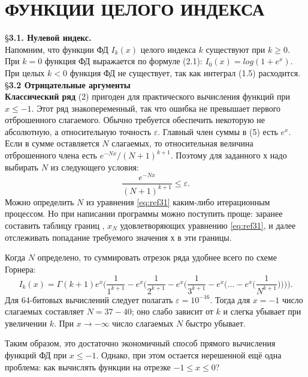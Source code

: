 \chapter{ФУНКЦИИ ЦЕЛОГО ИНДЕКСА}

\S \textbf{3.1. Нулевой индекс.}
\\

Напомним, что функции ФД $I_k(x)$ целого индекса $k$ существуют при $k \geqslant 0$. При $k = 0$ функция ФД выражается по формуле (2.1): $I_0(x)=log(1+e^x).$ При целых $k < 0$ функция ФД не существует, так как интеграл (1.5) расходится.
\\

\S \textbf{3.2 Отрицательные аргументы}
\\

\textbf{Классический ряд} (2) пригоден для практического вычисления функций
при $x \leqslant -1$. Этот ряд знакопеременный, так что ошибка не превышает первого
отброшенного слагаемого. Обычно требуется обеспечить некоторую не
абсолютную, а относительную точность $\varepsilon$. Главный член суммы в (5) есть $e^{x}$.
Если в сумме оставляется $N$ слагаемых, то относительная величина
отброшенного члена есть $e^{-Nx}/(N+1)^{k+1}$. Поэтому для заданного $х$ надо
выбирать $N$ из следующего условия:
\begin{equation}
\frac{e^{-Nx}}{(N+1)^{k+1}} \leqslant \varepsilon.
\label{eq:ref31}
\end{equation}
Можно определить $N$ из уравнения \ref{eq:ref31} каким-либо итерационным
процессом. Но при написании программы можно поступить проще: заранее
составить таблицу границ , $x_{N}$ удовлетворяющих уравнению \ref{eq:ref31}, и далее
отслеживать попадание требуемого значения $х$ в эти границы.

Когда $N$ определено, то суммировать отрезок ряда удобнее всего по схеме Горнера:
\begin{equation}
I_k(x)=\Gamma(k+1)e^{x}\Bigg(\frac{1}{1^{k+1}}-e^{x}\Bigg(\frac{1}{2^{k+1}}-e^{x}\Bigg(\frac{1}{3^{k+1}}-e^{x}\Bigg(...-e^{x}\Bigg(\frac{1}{N^{k+1}}\Bigg)\Bigg)\Bigg)\Bigg).
\end{equation}
Для 64-битовых вычислений следует полагать  $\varepsilon = 10^{-16}$. Тогда для $x = -1$
число слагаемых составляет $N = 37 - 40$; оно слабо зависит от $k$ и слегка
убывает при увеличении $k$. При $x \to -\infty$ число слагаемых $N$ быстро убывает.

Таким образом, это достаточно экономичный способ прямого вычисления функций ФД при $x \leqslant -1$. Однако, при этом остается нерешенной ещё одна проблема: как вычислять функции на отрезке $-1 \leqslant x \leqslant 0$?

